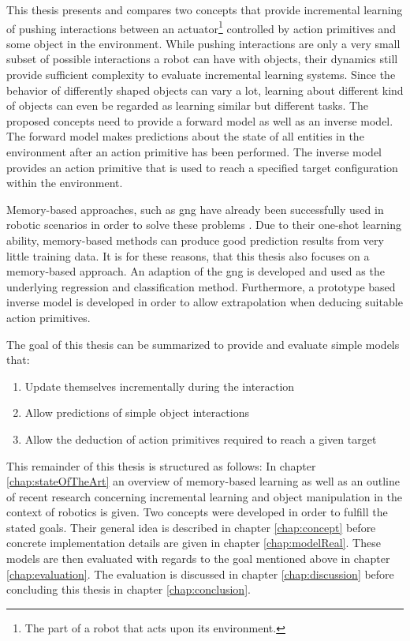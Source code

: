 This thesis presents and compares two concepts that provide incremental learning of pushing interactions between an actuator\footnote{The part of a robot that acts upon its environment.} controlled by action primitives and some object in the environment.
While pushing interactions are only a very small subset of possible interactions a robot can have with objects, their dynamics still provide sufficient complexity to evaluate incremental learning systems. Since the behavior of differently shaped objects can vary a lot, learning about different kind of objects can even be regarded as learning similar but different tasks. %
The proposed concepts need to provide a forward model as well as an inverse model. The forward model makes predictions about the state of all entities in the environment after an action primitive has been performed. The inverse model provides an action primitive that is used to reach a specified target configuration within the environment.

Memory-based approaches, such as \gls{gng} have already been successfully used in robotic scenarios in order to solve these problems \cite{carlevarino2000incremental}. Due to their one-shot learning ability, memory-based methods can produce good prediction results from very little training data. It is for these reasons, that this thesis also focuses on a memory-based approach. An adaption of the \gls{gng} is developed and used as the underlying regression and classification method. Furthermore, a prototype based inverse model is developed in order to allow extrapolation when deducing suitable action primitives.

The goal of this thesis can be summarized to provide and evaluate simple models that:

\begin{enumerate}
	\item Update themselves incrementally during the interaction
	\item Allow predictions of simple object interactions %
	\item Allow the deduction of action primitives required to reach a given target
\end{enumerate}

This remainder of this thesis is structured as follows: In chapter \ref{chap:stateOfTheArt} an overview of memory-based learning as well as an outline of recent research concerning incremental learning and object manipulation in the context of robotics is given. Two concepts were developed in order to fulfill the stated goals. Their general idea is described in chapter \ref{chap:concept} before concrete implementation details are given in chapter \ref{chap:modelReal}. These models are then evaluated with regards to the goal mentioned above in chapter \ref{chap:evaluation}. The evaluation is discussed in chapter \ref{chap:discussion} before concluding this thesis in chapter \ref{chap:conclusion}.

